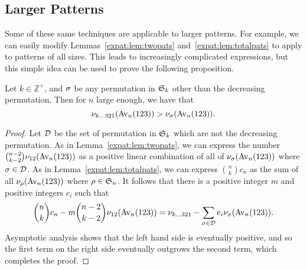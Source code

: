 \subsection{Larger Patterns}

  Some of these same techniques are applicable to larger patterns.  For
  example, we can easily modify Lemmas~\ref{expat:lem:twopats}
  and~\ref{expat:lem:totalpats} to apply to patterns of all sizes. This leads to
  increasingly complicated expressions, but this simple idea can be used to
  prove the following proposition. 

  \begin{proposition}
    Let $k \in \mathbb{Z}^+$, and $\sg$ be any permutation in $\S_k$
    other than the decreasing permutation. Then for $n$ large enough,
    we have that
    $$\num_{k \dots 3 2 1}(\Avn) > \num_{\sg}(\Avn).$$
  \end{proposition}

  \begin{proof}
    Let $\cD$ be the set of permutation in $\S_k$ which are not the
    decreasing permutation.  As in Lemma~\ref{expat:lem:twopats},  we can
    express the number $\binom{n-2}{k-2}\num_{12}(\Avn)$ as a positive linear
    combination of all of $\num_{\sg} (\Avn)$ where $\sg \in \cD$. As in
    Lemma~\ref{expat:lem:totalpats}, we can express $\binom{n}{k} c_n$ as the sum
    of all $\num_{\ro} (\Avn)$ where $\ro \in \S_n$.  It follows that there is
    a positive integer $m$ and positive
    integers $e_i$ such that
    $$ \binom{n}{k} c_n - m\binom{n-2}{k-2} \num_{12} (\Avn) = \num_{k \dots
    321} - \sum_{\sg \in \cD} e_i \num_{\sg} (\Avn).$$ Asymptotic analysis
    shows that the left hand side is eventually positive, and so the first term
    on the right side eventually outgrows the second term, which completes the
    proof.
  \end{proof}



  






